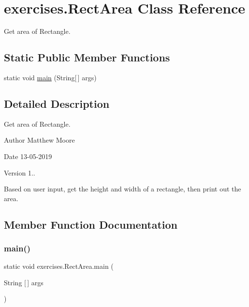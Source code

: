 \hypertarget{classexercises_1_1_rect_area}{}\section{exercises.\+Rect\+Area Class Reference}
\label{classexercises_1_1_rect_area}


Get area of Rectangle.  


\subsection*{Static Public Member Functions}
\begin{DoxyCompactItemize}
\item 
static void \mbox{\hyperlink{classexercises_1_1_rect_area_aa492a58bf51b78461c941b94845d6e50}{main}} (String\mbox{[}$\,$\mbox{]} args)
\end{DoxyCompactItemize}


\subsection{Detailed Description}
Get area of Rectangle. 

\begin{DoxyAuthor}{Author}
Matthew Moore 
\end{DoxyAuthor}
\begin{DoxyDate}{Date}
13-\/05-\/2019 
\end{DoxyDate}
\begin{DoxyVersion}{Version}
1..
\end{DoxyVersion}
Based on user input, get the height and width of a rectangle, then print out the area. 

\subsection{Member Function Documentation}
\mbox{\label{classexercises_1_1_rect_area_aa492a58bf51b78461c941b94845d6e50}} 
\subsubsection{\texorpdfstring{main()}{main()}}
{\footnotesize\ttfamily static void exercises.\+Rect\+Area.\+main (\begin{DoxyParamCaption}\item[{String \mbox{[}$\,$\mbox{]}}]{args }\end{DoxyParamCaption})\hspace{0.3cm}{\ttfamily [static]}}

